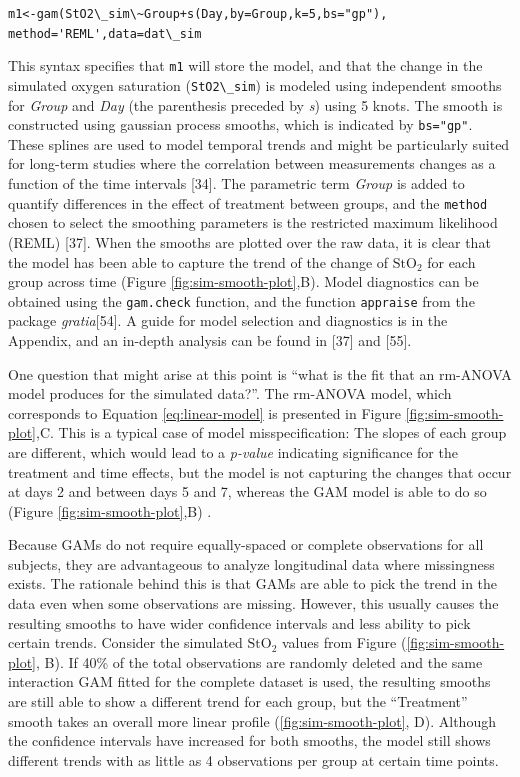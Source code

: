 \documentclass[
]{article}
\newcommand{\passthrough}[1]{#1}
\begin{document}
\passthrough{\lstinline!m1<-gam(StO2\_sim\~Group+s(Day,by=Group,k=5,bs="gp"), method='REML',data=dat\_sim!}

This syntax specifies that \passthrough{\lstinline!m1!} will store the model, and that the change in the simulated oxygen saturation (\passthrough{\lstinline!StO2\_sim!}) is modeled using independent smooths for \emph{Group} and \emph{Day} (the parenthesis preceded by \emph{s}) using 5 knots. The smooth is constructed using gaussian process smooths, which is indicated by \passthrough{\lstinline!bs="gp"!}. These splines are used to model temporal trends and might be particularly suited for long-term studies where the correlation between measurements changes as a function of the time intervals {[}34{]}. The parametric term \emph{Group} is added to quantify differences in the effect of treatment between groups, and the \passthrough{\lstinline!method!} chosen to select the smoothing parameters is the restricted maximum likelihood (REML) {[}37{]}. When the smooths are plotted over the raw data, it is clear that the model has been able to capture the trend of the change of \(\mbox{StO}_2\) for each group across time (Figure \ref{fig:sim-smooth-plot},B). Model diagnostics can be obtained using the \passthrough{\lstinline!gam.check!} function, and the function \passthrough{\lstinline!appraise!} from the package \emph{gratia}{[}54{]}. A guide for model selection and diagnostics is in the Appendix, and an in-depth analysis can be found in {[}37{]} and {[}55{]}.

One question that might arise at this point is ``what is the fit that an rm-ANOVA model produces for the simulated data?''. The rm-ANOVA model, which corresponds to Equation \eqref{eq:linear-model} is presented in Figure \ref{fig:sim-smooth-plot},C. This is a typical case of model misspecification: The slopes of each group are different, which would lead to a \emph{p-value} indicating significance for the treatment and time effects, but the model is not capturing the changes that occur at days 2 and between days 5 and 7, whereas the GAM model is able to do so (Figure \ref{fig:sim-smooth-plot},B) .

Because GAMs do not require equally-spaced or complete observations for all subjects, they are advantageous to analyze longitudinal data where missingness exists. The rationale behind this is that GAMs are able to pick the trend in the data even when some observations are missing. However, this usually causes the resulting smooths to have wider confidence intervals and less ability to pick certain trends. Consider the simulated \(\mbox{StO}_2\) values from Figure (\ref{fig:sim-smooth-plot}, B). If 40\% of the total observations are randomly deleted and the same interaction GAM fitted for the complete dataset is used, the resulting smooths are still able to show a different trend for each group, but the ``Treatment'' smooth takes an overall more linear profile (\ref{fig:sim-smooth-plot}, D). Although the confidence intervals have increased for both smooths, the model still shows different trends with as little as 4 observations per group at certain time points.
\end{document}
